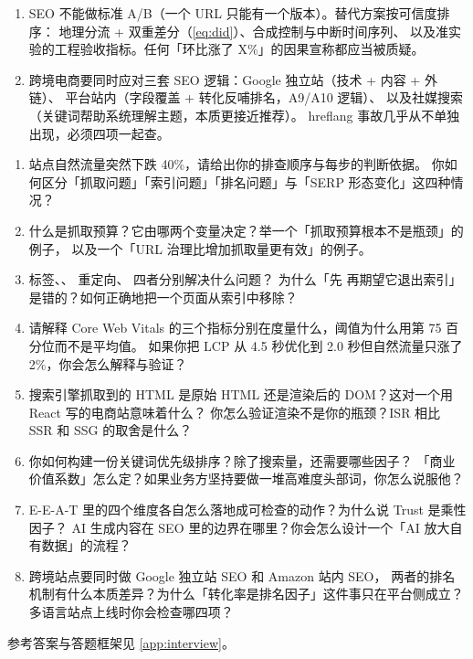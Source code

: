 \begin{keypoint}[本章要点回顾]
\begin{enumerate}
        链接形态、时效留存、流量佐证六个维度。白帽路径是数字 PR、客座、
        资源页收录、数据研究、专家问答；黑帽的代价是惩罚与以季度计的恢复期，
        而恢复的本质是「重新变得值得信任」，不是「擦掉证据」。
  \item SEO 不能做标准 A/B（一个 URL 只能有一个版本）。替代方案按可信度排序：
        地理分流 + 双重差分（\cref{eq:did}）、合成控制与中断时间序列、
        以及准实验的工程验收指标。任何「环比涨了 X\%」的因果宣称都应当被质疑。
  \item 跨境电商要同时应对三套 SEO 逻辑：Google 独立站（技术 + 内容 + 外链）、
        平台站内（字段覆盖 + 转化反哺排名，A9/A10 逻辑）、
        以及社媒搜索（关键词帮助系统理解主题，本质更接近推荐）。
        hreflang 事故几乎从不单独出现，必须四项一起查。
\end{enumerate}
\end{keypoint}

\begin{interview}[本章对应的面试题]
\begin{enumerate}
  \item 站点自然流量突然下跌 40\%，请给出你的排查顺序与每步的判断依据。
        你如何区分「抓取问题」「索引问题」「排名问题」与「SERP 形态变化」这四种情况？
  \item 什么是抓取预算？它由哪两个变量决定？举一个「抓取预算根本不是瓶颈」的例子，
        以及一个「URL 治理比增加抓取量更有效」的例子。
  \item {} 标签、、 重定向、 四者分别解决什么问题？
        为什么「先  再期望它退出索引」是错的？如何正确地把一个页面从索引中移除？
  \item 请解释 Core Web Vitals 的三个指标分别在度量什么，阈值为什么用第 75 百分位而不是平均值。
        如果你把 LCP 从 4.5 秒优化到 2.0 秒但自然流量只涨了 2\%，你会怎么解释与验证？
  \item 搜索引擎抓取到的 HTML 是原始 HTML 还是渲染后的 DOM？这对一个用 React 写的电商站意味着什么？
        你怎么验证渲染不是你的瓶颈？ISR 相比 SSR 和 SSG 的取舍是什么？
  \item 你如何构建一份关键词优先级排序？除了搜索量，还需要哪些因子？
        「商业价值系数」怎么定？如果业务方坚持要做一堆高难度头部词，你怎么说服他？
  \item E-E-A-T 里的四个维度各自怎么落地成可检查的动作？为什么说 Trust 是乘性因子？
        AI 生成内容在 SEO 里的边界在哪里？你会怎么设计一个「AI 放大自有数据」的流程？
  \item 跨境站点要同时做 Google 独立站 SEO 和 Amazon 站内 SEO，
        两者的排名机制有什么本质差异？为什么「转化率是排名因子」这件事只在平台侧成立？
        多语言站点上线时你会检查哪四项？
\end{enumerate}
参考答案与答题框架见 \cref{app:interview}。
\end{interview}

